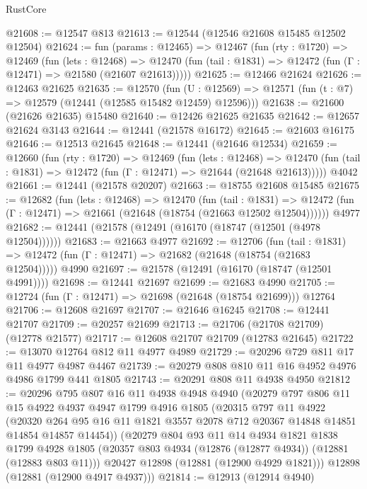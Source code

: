 \begin{lexlean}{RustCore}
\begin{coremodule}
@21608 := @12547 @813
@21613 := @12544 (@12546 @21608 @15485 @12502 @12504)
@21624 := fun (params : @12465) =>
  @12467
    (fun (rty : @1720) =>
    @12469
      (fun (lets : @12468) =>
      @12470 (fun (tail : @1831) => @12472 (fun (Γ : @12471) => @21580 (@21607 @21613)))))
@21625 := @12466 @21624
@21626 := @12463 @21625
@21635 := @12570
    (fun (U : @12569) => @12571 (fun (t : @7) => @12579 (@12441 (@12585 @15482 @12459) @12596)))
@21638 := @21600 (@21626 @21635) @15480
@21640 := @12426 @21625 @21635
@21642 := @12657 @21624 @3143
@21644 := @12441 (@21578 @16172)
@21645 := @21603 @16175
@21646 := @12513 @21645
@21648 := @12441 (@21646 @12534)
@21659 := @12660
    (fun (rty : @1720) =>
    @12469
      (fun (lets : @12468) =>
      @12470 (fun (tail : @1831) => @12472 (fun (Γ : @12471) => @21644 (@21648 @21613)))))
    @4042
@21661 := @12441 (@21578 @20207)
@21663 := @18755 @21608 @15485
@21675 := @12682
    (fun (lets : @12468) =>
    @12470
      (fun (tail : @1831) =>
      @12472 (fun (Γ : @12471) => @21661 (@21648 (@18754 (@21663 @12502 @12504))))))
    @4977
@21682 := @12441 (@21578 (@12491 (@16170 (@18747 (@12501 (@4978 @12504))))))
@21683 := @21663 @4977
@21692 := @12706
    (fun (tail : @1831) => @12472 (fun (Γ : @12471) => @21682 (@21648 (@18754 (@21683 @12504)))))
    @4990
@21697 := @21578 (@12491 (@16170 (@18747 (@12501 @4991))))
@21698 := @12441 @21697
@21699 := @21683 @4990
@21705 := @12724 (fun (Γ : @12471) => @21698 (@21648 (@18754 @21699))) @12764
@21706 := @12608 @21697
@21707 := @21646 @16245
@21708 := @12441 @21707
@21709 := @20257 @21699
@21713 := @21706 (@21708 @21709) (@12778 @21577)
@21717 := @12608 @21707 @21709 (@12783 @21645)
@21722 := @13070 @12764 @812 @11 @4977 @4989
@21729 := @20296 @729 @811 @17 @11 @4977 @4987 @4467
@21739 := @20279 @808 @810 @11 @16 @4952 @4976 @4986 @1799 @441 @1805
@21743 := @20291 @808 @11 @4938 @4950
@21812 := @20296
    @795
    @807
    @16
    @11
    @4938
    @4948
    @4940
    (@20279
      @797
      @806
      @11
      @15
      @4922
      @4937
      @4947
      @1799
      @4916
      @1805
      (@20315
        @797
        @11
        @4922
        (@20320 @264 @95 @16 @11 @1821 @3557 @2078 @712 @20367 @14848 @14851 @14854 @14857 @14454))
      (@20279
        @804
        @93
        @11
        @14
        @4934
        @1821
        @1838
        @1799
        @4928
        @1805
        (@20357 @803 @4934 (@12876 (@12877 @4934)) (@12881 (@12883 @803 @11)))
        @20427
        @12898
        (@12881 (@12900 @4929 @1821)))
      @12898
      (@12881 (@12900 @4917 @4937)))
@21814 := @12913 (@12914 @4940)

\end{coremodule}
\end{lexlean}
